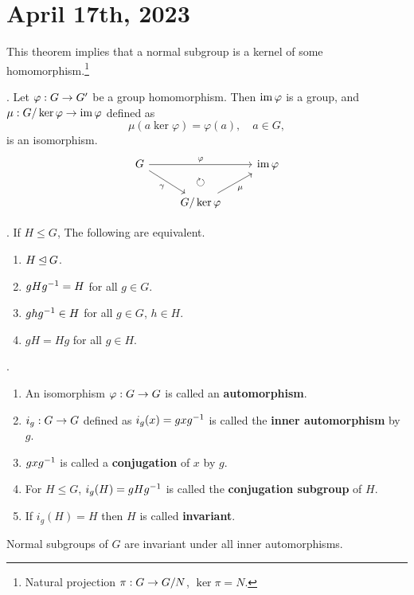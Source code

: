 \section*{April 17th, 2023}

This theorem implies that a normal subgroup is a kernel of some homomorphism.\footnote{Natural projection \(\pi : G \rightarrow G/N\), \(\ker\pi = N\).}

\thm.  Let \(\varphi : G \rightarrow G'\) be a group homomorphism. Then \(\operatorname{im} \varphi\) is a group, and \(\mu: G/\ker\varphi \rightarrow \operatorname{im} \varphi\) defined as
\[
    \mu(a \ker\varphi) = \varphi(a), \quad a \in G,
\]
is an isomorphism.
\[
    \begin{tikzcd}
        G \arrow{rr}{\varphi} \arrow[swap]{dr}{\gamma} & \arrow[d, phantom, "\circlearrowright"]& \im \varphi \\
        & G/ \ker\varphi \arrow[swap]{ur}{\mu} &
    \end{tikzcd}
\]

\thm. If \(H \leq G\), The following are equivalent.
\begin{enumerate}
    \item \(H \unlhd G\).
    \item \(gHg^{-1} = H\) for all \(g \in G\).
    \item \(ghg^{-1} \in H\) for all \(g \in G\), \(h \in H\).
    \item \(gH = Hg\) for all \(g \in H\).
\end{enumerate}

. 
\begin{enumerate}
    \item An isomorphism \(\varphi : G \rightarrow G\) is called an \textbf{automorphism}.
    \item \(i_g : G \rightarrow G\) defined as \(i_g(x) = gxg^{-1}\) is called the \textbf{inner automorphism} by \(g\).
    \item \(gxg^{-1}\) is called a \textbf{conjugation} of \(x\) by \(g\).
    \item For \(H \leq G\), \(i_g(H) = gHg^{-1}\) is called the \textbf{conjugation subgroup} of \(H\).
    \item If \(i_g(H) = H\) then \(H\) is called \textbf{invariant}.
\end{enumerate}

\rmk Normal subgroups of \(G\) are invariant under all inner automorphisms.

\pagebreak


